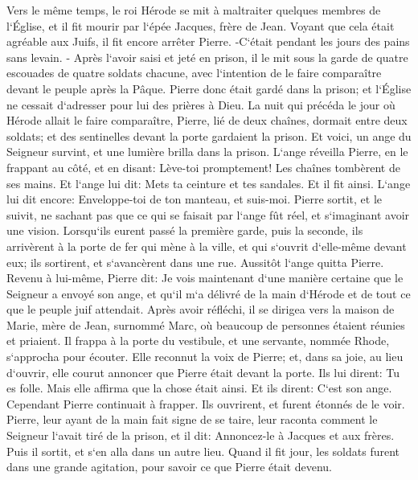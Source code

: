 \verse Vers le même temps, le roi Hérode se mit à maltraiter quelques membres de l`Église, 
\verse et il fit mourir par l`épée Jacques, frère de Jean. 
\verse Voyant que cela était agréable aux Juifs, il fit encore arrêter Pierre. -C`était pendant les jours des pains sans levain. - 
\verse Après l`avoir saisi et jeté en prison, il le mit sous la garde de quatre escouades de quatre soldats chacune, avec l`intention de le faire comparaître devant le peuple après la Pâque. 
\verse Pierre donc était gardé dans la prison; et l`Église ne cessait d`adresser pour lui des prières à Dieu. 
\verse La nuit qui précéda le jour où Hérode allait le faire comparaître, Pierre, lié de deux chaînes, dormait entre deux soldats; et des sentinelles devant la porte gardaient la prison. 
\verse Et voici, un ange du Seigneur survint, et une lumière brilla dans la prison. L`ange réveilla Pierre, en le frappant au côté, et en disant: Lève-toi promptement! Les chaînes tombèrent de ses mains. 
\verse Et l`ange lui dit: Mets ta ceinture et tes sandales. Et il fit ainsi. L`ange lui dit encore: Enveloppe-toi de ton manteau, et suis-moi. 
\verse Pierre sortit, et le suivit, ne sachant pas que ce qui se faisait par l`ange fût réel, et s`imaginant avoir une vision. 
\verse Lorsqu`ils eurent passé la première garde, puis la seconde, ils arrivèrent à la porte de fer qui mène à la ville, et qui s`ouvrit d`elle-même devant eux; ils sortirent, et s`avancèrent dans une rue. Aussitôt l`ange quitta Pierre. 
\verse Revenu à lui-même, Pierre dit: Je vois maintenant d`une manière certaine que le Seigneur a envoyé son ange, et qu`il m`a délivré de la main d`Hérode et de tout ce que le peuple juif attendait. 
\verse Après avoir réfléchi, il se dirigea vers la maison de Marie, mère de Jean, surnommé Marc, où beaucoup de personnes étaient réunies et priaient. 
\verse Il frappa à la porte du vestibule, et une servante, nommée Rhode, s`approcha pour écouter. 
\verse Elle reconnut la voix de Pierre; et, dans sa joie, au lieu d`ouvrir, elle courut annoncer que Pierre était devant la porte. 
\verse Ils lui dirent: Tu es folle. Mais elle affirma que la chose était ainsi. 
\verse Et ils dirent: C`est son ange. Cependant Pierre continuait à frapper. Ils ouvrirent, et furent étonnés de le voir. 
\verse Pierre, leur ayant de la main fait signe de se taire, leur raconta comment le Seigneur l`avait tiré de la prison, et il dit: Annoncez-le à Jacques et aux frères. Puis il sortit, et s`en alla dans un autre lieu. 
\verse Quand il fit jour, les soldats furent dans une grande agitation, pour savoir ce que Pierre était devenu. 
